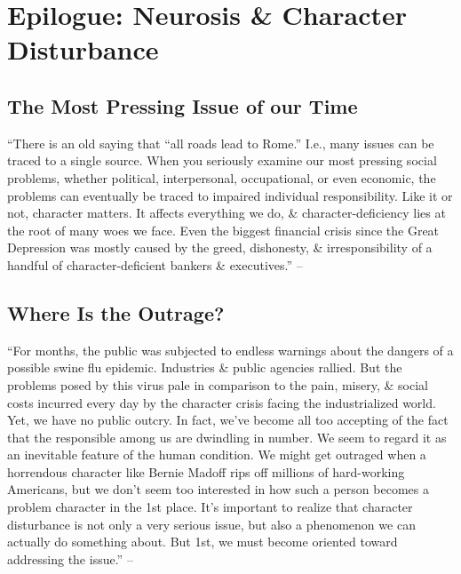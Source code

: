 \documentclass{article}
\numberwithin{equation}{section}
\begin{document}

\section{Epilogue: Neurosis \& Character Disturbance}

\subsection{The Most Pressing Issue of our Time}
``There is an old saying that ``all roads lead to Rome.'' I.e., many issues can be traced to a single source. When you seriously examine our most pressing social problems, whether political, interpersonal, occupational, or even economic, the problems can eventually be traced to impaired individual responsibility. Like it or not, character matters. It affects everything we do, \& character-deficiency lies at the root of many woes we face. Even the biggest financial crisis since the Great Depression was mostly caused by the greed, dishonesty, \& irresponsibility of a handful of character-deficient bankers \& executives.'' -- \cite[p. 235]{Simon2011}

\subsection{Where Is the Outrage?}
``For months, the public was subjected to endless warnings about the dangers of a possible swine flu epidemic. Industries \& public agencies rallied. But the problems posed by this virus pale in comparison to the pain, misery, \& social costs incurred every day by the character crisis facing the industrialized world. Yet, we have no public outcry. In fact, we've become all too accepting of the fact that the responsible among us are dwindling in number. We seem to regard it as an inevitable feature of the human condition. We might get outraged when a horrendous character like Bernie Madoff rips off millions of hard-working Americans, but we don't seem too interested in how such a person becomes a problem character in the 1st place. It's important to realize that character disturbance is not only a very serious issue, but also a phenomenon we can actually do something about. But 1st, we must become oriented toward addressing the issue.'' -- \cite[p. 235]{Simon2011}
\end{document}
